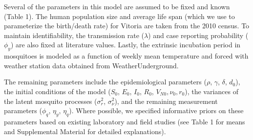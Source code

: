 \documentclass[10pt,letterpaper]{article}
\begin{document}
Several of the parameters in this model are assumed to be fixed and known (Table 1).
The human population size and average life span (which we use to parameterize the birth/death rate) for Vitoria are taken from the 2010 census.
To maintain identifiability, the transmission rate ($\lambda$) and case reporting probability ($\phi_y$) are also fixed at literature values.
Lastly, the extrinsic incubation period in mosquitoes is modeled as a function of weekly mean temperature and forced with weather station data obtained from WeatherUnderground.

The remaining parameters include the epidemiological parameters ($\rho$, $\gamma$, $\delta$, $d_0$), the initial conditions of the model ($S_0$, $E_0$, $I_0$, $R_0$, $V_{N0}, \nu_0, r_0$), the variances of the latent mosquito processes ($\sigma^2_r$, $\sigma^2_{\nu}$), and the remaining measurement parameters ($\phi_q$, $\eta_y$, $\eta_q$).  
Where possible, we specified informative priors on these parameters based on existing laboratory and field studies (see Table 1 for means and Supplemental Material for detailed explanations).
\end{document}
